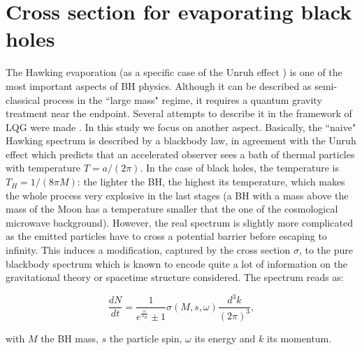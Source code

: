 \documentclass[twocolumn,amsmath,amssymb,prl,10pt,nofootinbib,superscriptaddress]{revtex4}
\def\be{\begin{equation}}
\def\ee{\end{equation}}
\begin{document}
\section{Cross section for evaporating black holes}

The Hawking evaporation \cite{Hawkin} (as a specific case of the Unruh effect \cite{Unruh:1976db}) is one of the most important aspects of BH physics. Although it can be described as semi-classical process in the ``large mass" regime, it requires a quantum gravity treatment near the endpoint. Several attempts to describe it in the framework of LQG were made \cite{Ashtekar:2005cj,Barrau:2011md,Gambini:2013nea}. In this study we focus on another aspect. Basically, the ``naive" Hawking spectrum is described by a blackbody law, in agreement with the Unruh effect which predicts that an accelerated observer sees a bath of thermal particles with temperature $T=a/(2\pi)$. In the case of black holes, the temperature is $T_H=1/(8 \pi M)$: the lighter the BH, the highest its temperature, which makes the whole process very explosive in the last stages (a BH with a mass above the mass of the Moon has a temperature smaller that the one of the cosmological microwave background). However, the real spectrum is slightly more complicated as the emitted particles have to cross a potential barrier before escaping to infinity. This induces a modification, captured by the cross section $\sigma$, to the pure blackbody spectrum which is known to encode quite a lot of information on the gravitational theory or spacetime structure considered. The spectrum reads as:

\be
\frac{dN}{dt}= \frac{1}{e^{\frac{\omega}{T_H}} \pm 1} \sigma(M,s,\omega) \frac{d^3k}{(2 \pi )^3}, 
\ee

\noindent with $M$ the BH mass, $s$ the particle spin, $\omega$ its energy and $k$ its momentum.\\ 
\end{document}
